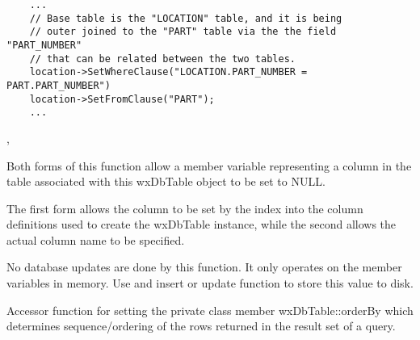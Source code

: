 
\begin{verbatim}
    ...
    // Base table is the "LOCATION" table, and it is being
    // outer joined to the "PART" table via the the field "PART_NUMBER"
    // that can be related between the two tables.
    location->SetWhereClause("LOCATION.PART_NUMBER = PART.PART_NUMBER")
    location->SetFromClause("PART");
    ...
\end{verbatim}


, 


\label{wxdbtablesetcolnull}



Both forms of this function allow a member variable representing a column 
in the table associated with this wxDbTable object to be set to NULL.

The first form allows the column to be set by the index into the column 
definitions used to create the wxDbTable instance, while the second allows 
the actual column name to be specified.





No database updates are done by this function.  It only operates on the 
member variables in memory.  Use and insert or update function to store this 
value to disk.


\label{wxdbtablesetorderbyclause}


Accessor function for setting the private class member wxDbTable::orderBy 
which determines sequence/ordering of the rows returned in the result set 
of a query.

